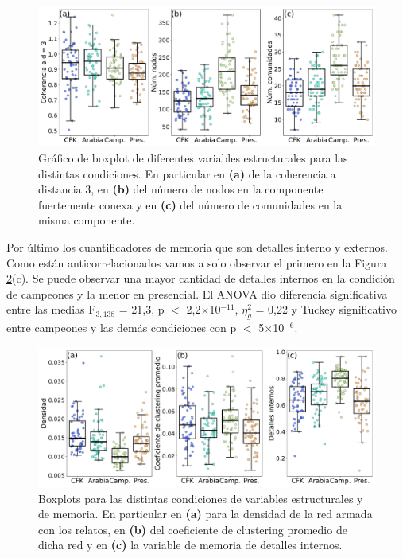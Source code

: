 \begin{figure}[H]
    \centering
    \includegraphics[width = 15cm]{figures/ch03/Herramientas NPL/Primer tiempo/Sin control/estructurales1op2_boxplot.pdf} 
    \caption{Gráfico de boxplot de diferentes variables estructurales para las distintas condiciones. En particular en \textbf{(a)} de la coherencia a distancia 3, en  \textbf{(b)} del número de nodos en la componente fuertemente conexa y en \textbf{(c)} del número de comunidades en la misma componente.}
\label{fig:cap3_vars_estructurales}
\end{figure}

Por último los cuantificadores de memoria que son detalles interno y externos. Como están anticorrelacionados vamos a solo observar el primero en la Figura \ref{fig:cap3_vars_mem}(c). Se puede observar una mayor cantidad de detalles internos en la condición de campeones y la menor en presencial. El ANOVA dio diferencia significativa entre las medias F$_{3, 138}$ = 21,3, p $<$ 2,2$\times$10$^{-11}$, $\eta_g^2$ = 0,22 y Tuckey significativo entre campeones y las demás condiciones con p $<$ 5$\times$10$^{-6}$.


\begin{figure}[H]
    \centering
    \includegraphics[width = 15cm]{figures/ch03/Herramientas NPL/Primer tiempo/Sin control/estructurales2op2_boxplot.pdf} 
    \caption{Boxplots para las distintas condiciones de variables estructurales y de memoria. En particular en \textbf{(a)} para la densidad de la red armada con los relatos, en \textbf{(b)} del coeficiente de clustering promedio de dicha red y en \textbf{(c)} la variable de memoria de detalles internos.}
\label{fig:cap3_vars_mem}
\end{figure}


